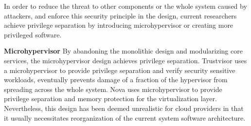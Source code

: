 \documentclass[conference]{IEEEtran}
\begin{document}
In order to reduce the threat to other components or the whole system caused by attackers, and enforce this security principle in the design, current researchers achieve privilege separation by introducing microhypervisor or creating more privileged software.


\textbf{Microhypervisor}
By abandoning the monolithic design and modularizing core services, the microhypervisor design achieves privilege separation.
Trustvisor\cite{J2010TrustVisor} uses a microhypervisor to provide privilege separation and verify security sensitive workloads, eventually prevents damage of a fraction of the hypervisor from spreading across the whole system. Nova\cite{Steinberg2010NOVA} uses microhypervisor to provide privilege separation and memory protection for the virtualization layer. Nevertheless, this design has been deemed unrealistic for cloud providers in that it usually necessitates reorganization of the current system software architecture. 

\end{document}
